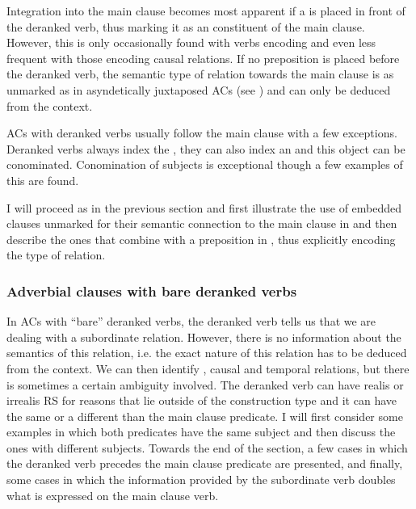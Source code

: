 Integration into the main clause becomes most apparent if a  is placed in front of the deranked verb, thus marking it as an  constituent of the main clause. However, this is only occasionally found with verbs encoding  and even less frequent with those encoding causal relations. If no preposition is placed before the deranked verb, the semantic type of relation towards the main clause is as unmarked as in asyndetically juxtaposed ACs (see ) and can only be deduced from the context.

ACs with deranked verbs usually follow the main clause with a few exceptions. Deranked verbs always index the , they can also index an  and this object can be conominated. Conomination of subjects is exceptional though a few examples of this are found.


I will proceed as in the previous section and first illustrate the use of embedded clauses unmarked for their semantic connection to the main clause in  and then describe the ones that combine with a preposition in , thus explicitly encoding the type of relation.

\subsubsection{Adverbial clauses with bare deranked verbs}\label{sec:EmbeddedAC_bare}

In ACs with “bare” deranked verbs, the deranked verb tells us that we are dealing with a subordinate relation. However, there is no information about the semantics of this relation, i.e. the exact nature of this relation has to be deduced from the context. We can then identify , causal and temporal relations, but there is sometimes a certain ambiguity involved.
The deranked verb can have realis or irrealis RS for reasons that lie outside of the construction type and it can have the same or a different  than the main clause predicate. 
I will first consider some examples in which both predicates have the same subject and then discuss the ones with different subjects. Towards the end of the section, a few cases in which the deranked verb precedes the main clause predicate are presented, and finally, some cases in which the information provided by the subordinate verb doubles what is expressed on the main clause verb.

